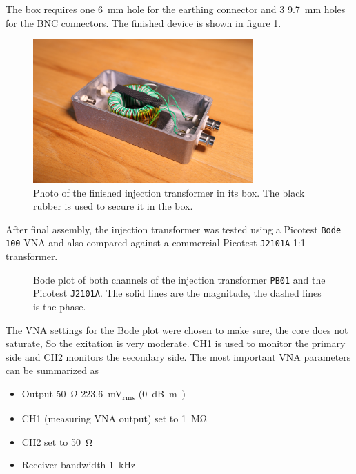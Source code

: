 \documentclass[12pt]{book}
\providecommand{\device}[1]{\texttt{\small #1}}
\begin{document}
The box requires one \qty{6}{\mm} hole for the earthing connector and 3 \qty{9.7}{\mm} holes for the BNC connectors. The finished device is shown in figure \ref{fig:injection_transformer_assembled}.

\begin{figure}[ht]
    \centering
    \includegraphics[width=0.75\textwidth]{../images/transformer_cropped_lowres.jpg}
    \caption{Photo of the finished injection transformer in its box. The black rubber is used to secure it in the box.}
    \label{fig:injection_transformer_assembled}
\end{figure}

After final assembly, the injection transformer was tested using a Picotest \device{Bode 100} VNA and also compared against a commercial Picotest \device{J2101A} 1:1 transformer.

\begin{figure}[hb!]
    \centering
    
    \caption{Bode plot of both channels of the injection transformer \device{PB01} and the Picotest \device{J2101A}. The solid lines are the magnitude, the dashed lines is the phase.}
    \label{fig:injection_transformer_bode}
\end{figure}

The VNA settings for the Bode plot were chosen to make sure, the core does not saturate, So the exitation is very moderate. CH1 is used to monitor the primary side and CH2 monitors the secondary side. The most important VNA parameters can be summarized as

\begin{itemize}
    \itemsep0em
    \item Output \qty{50}{\ohm} \qty{223.6}{\mV_{rms}} (\qty{0}{\dB m)}
    \item CH1 (measuring VNA output) set to \qty{1}{\mega\ohm}
    \item CH2 set to \qty{50}{\ohm}
    \item Receiver bandwidth \qty{1}{\kHz}
\end{itemize}
\end{document}
